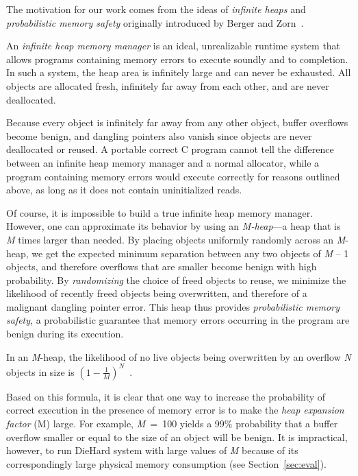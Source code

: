 \documentclass{acm_proc_article-sp}
\begin{document}
\noindent
The motivation for our work comes from the ideas of \emph{infinite
heaps} and \emph{probabilistic memory safety} originally introduced by
Berger and Zorn~\cite{1134000}.

An \emph{infinite heap memory manager} is an ideal,
unrealizable runtime system that allows programs containing memory
errors to execute soundly and to completion. In such a system, the
heap area is infinitely large and can never be exhausted. All objects
are allocated fresh, infinitely far away from each other, and are
never deallocated.

Because every object is infinitely far away from any other object,
buffer overflows become benign, and dangling pointers also vanish
since objects are never deallocated or reused. A portable correct C
program cannot tell the difference between an infinite heap memory
manager and a normal allocator, while a program containing memory
errors would execute correctly for reasons outlined above, as long as
it does not contain uninitialized reads.

Of course, it is impossible to build a true infinite heap memory
manager. However, one can approximate its behavior by using an
\emph{M-heap}---a heap that is \textit{M} times larger than
needed. By placing objects uniformly randomly across an
\textit{M}-heap, we get the expected minimum separation between any
two objects of \textit{M} -- 1 objects, and therefore overflows that
are smaller become benign with high probability. By
\emph{randomizing} the choice of freed objects to reuse, we minimize the
likelihood of recently freed objects being overwritten, and therefore
of a malignant dangling pointer error. This heap thus provides
\emph{probabilistic memory safety}, a probabilistic guarantee that
memory errors occurring in the program are benign during its
execution.

\newpage

In an \textit{M}-heap, the likelihood of no live objects being
overwritten by an overflow \textit{N} objects in size is
$(1-\frac{1}{M})^{N}$~\cite{1134000}.

Based on this formula, it is clear that one way to increase the
probability of correct execution in the presence of memory error is to
make the \emph{heap expansion factor} (M) large. For example,
\textit{M}~=~100 yields a 99\% probability that a buffer overflow
smaller or equal to the size of an object will be benign. It is
impractical, however, to run DieHard system with large values of
\textit{M} because of its correspondingly large physical memory
consumption (see Section~\ref{sec:eval}).
\end{document}
